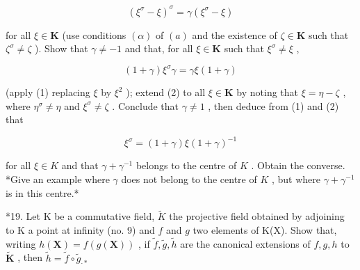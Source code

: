 \[
(\xi^ {\sigma} - \xi) ^ {\sigma} = \gamma (\xi^ {\sigma} - \xi)\tag{1}
\]

for all \(\xi \in \mathbf{K}\) (use conditions \((\alpha)\) of \((a)\) and the existence of \(\zeta \in \mathbf{K}\) such that \(\zeta^{\sigma} \neq \zeta\) ). Show that \(\gamma \neq -1\) and that, for all \(\xi \in \mathbf{K}\) such that \(\xi^{\sigma} \neq \xi\) ,

\[
(1 + \gamma) \xi^ {\sigma} \gamma = \gamma \xi (1 + \gamma)\tag{2}
\]

(apply (1) replacing \(\xi\) by \(\xi^2\) ); extend (2) to all \(\xi \in \mathbf{K}\) by noting that \(\xi = \eta - \zeta\) , where \(\eta^\sigma \neq \eta\) and \(\xi^\sigma \neq \zeta\) . Conclude that \(\gamma \neq 1\) , then deduce from (1) and (2) that

\[
\xi^ {\sigma} = (1 + \gamma) \xi (1 + \gamma) ^ {- 1}\tag{3}
\]

for all \(\xi \in K\) and that \(\gamma + \gamma^{-1}\) belongs to the centre of \(K\) . Obtain the converse. *Give an example where \(\gamma\) does not belong to the centre of \(K\) , but where \(\gamma + \gamma^{-1}\) is in this centre.*

*19. Let K be a commutative field, \(\tilde{K}\) the projective field obtained by adjoining to K a point at infinity (no. 9) and \(f\) and \(g\) two elements of K(X). Show that, writing \(h(\mathbf{X}) = f(g(\mathbf{X}))\) , if \(\tilde{f}, \tilde{g}, \tilde{h}\) are the canonical extensions of \(f, g, h\) to \(\tilde{\mathbf{K}}\) , then \(\tilde{h} = \tilde{f} \circ \tilde{g}_{\cdot *}\)

